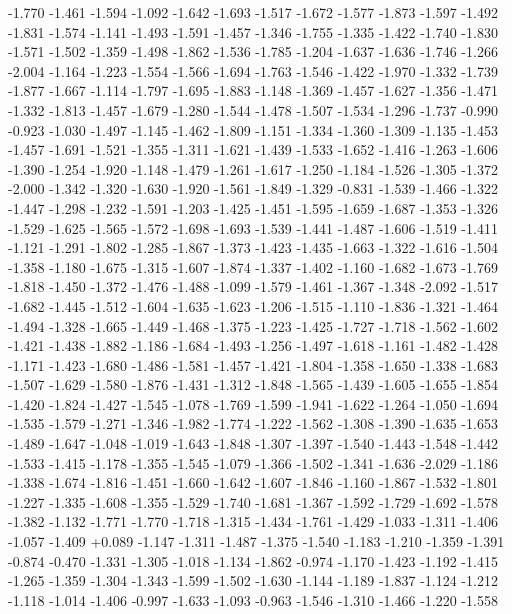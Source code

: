 \documentclass[9pt]{article}
\theoremstyle{plain}
\theoremstyle{definition}
\theoremstyle{remark}
\numberwithin{equation}{section}
\begin{document}
-1.770
-1.461
-1.594
-1.092
-1.642
-1.693
-1.517
-1.672
-1.577
-1.873
-1.597
-1.492
-1.831
-1.574
-1.141
-1.493
-1.591
-1.457
-1.346
-1.755
-1.335
-1.422
-1.740
-1.830
-1.571
-1.502
-1.359
-1.498
-1.862
-1.536
-1.785
-1.204
-1.637
-1.636
-1.746
-1.266
-2.004
-1.164
-1.223
-1.554
-1.566
-1.694
-1.763
-1.546
-1.422
-1.970
-1.332
-1.739
-1.877
-1.667
-1.114
-1.797
-1.695
-1.883
-1.148
-1.369
-1.457
-1.627
-1.356
-1.471
-1.332
-1.813
-1.457
-1.679
-1.280
-1.544
-1.478
-1.507
-1.534
-1.296
-1.737
-0.990
-0.923
-1.030
-1.497
-1.145
-1.462
-1.809
-1.151
-1.334
-1.360
-1.309
-1.135
-1.453
-1.457
-1.691
-1.521
-1.355
-1.311
-1.621
-1.439
-1.533
-1.652
-1.416
-1.263
-1.606
-1.390
-1.254
-1.920
-1.148
-1.479
-1.261
-1.617
-1.250
-1.184
-1.526
-1.305
-1.372
-2.000
-1.342
-1.320
-1.630
-1.920
-1.561
-1.849
-1.329
-0.831
-1.539
-1.466
-1.322
-1.447
-1.298
-1.232
-1.591
-1.203
-1.425
-1.451
-1.595
-1.659
-1.687
-1.353
-1.326
-1.529
-1.625
-1.565
-1.572
-1.698
-1.693
-1.539
-1.441
-1.487
-1.606
-1.519
-1.411
-1.121
-1.291
-1.802
-1.285
-1.867
-1.373
-1.423
-1.435
-1.663
-1.322
-1.616
-1.504
-1.358
-1.180
-1.675
-1.315
-1.607
-1.874
-1.337
-1.402
-1.160
-1.682
-1.673
-1.769
-1.818
-1.450
-1.372
-1.476
-1.488
-1.099
-1.579
-1.461
-1.367
-1.348
-2.092
-1.517
-1.682
-1.445
-1.512
-1.604
-1.635
-1.623
-1.206
-1.515
-1.110
-1.836
-1.321
-1.464
-1.494
-1.328
-1.665
-1.449
-1.468
-1.375
-1.223
-1.425
-1.727
-1.718
-1.562
-1.602
-1.421
-1.438
-1.882
-1.186
-1.684
-1.493
-1.256
-1.497
-1.618
-1.161
-1.482
-1.428
-1.171
-1.423
-1.680
-1.486
-1.581
-1.457
-1.421
-1.804
-1.358
-1.650
-1.338
-1.683
-1.507
-1.629
-1.580
-1.876
-1.431
-1.312
-1.848
-1.565
-1.439
-1.605
-1.655
-1.854
-1.420
-1.824
-1.427
-1.545
-1.078
-1.769
-1.599
-1.941
-1.622
-1.264
-1.050
-1.694
-1.535
-1.579
-1.271
-1.346
-1.982
-1.774
-1.222
-1.562
-1.308
-1.390
-1.635
-1.653
-1.489
-1.647
-1.048
-1.019
-1.643
-1.848
-1.307
-1.397
-1.540
-1.443
-1.548
-1.442
-1.533
-1.415
-1.178
-1.355
-1.545
-1.079
-1.366
-1.502
-1.341
-1.636
-2.029
-1.186
-1.338
-1.674
-1.816
-1.451
-1.660
-1.642
-1.607
-1.846
-1.160
-1.867
-1.532
-1.801
-1.227
-1.335
-1.608
-1.355
-1.529
-1.740
-1.681
-1.367
-1.592
-1.729
-1.692
-1.578
-1.382
-1.132
-1.771
-1.770
-1.718
-1.315
-1.434
-1.761
-1.429
-1.033
-1.311
-1.406
-1.057
-1.409
+0.089
-1.147
-1.311
-1.487
-1.375
-1.540
-1.183
-1.210
-1.359
-1.391
-0.874
-0.470
-1.331
-1.305
-1.018
-1.134
-1.862
-0.974
-1.170
-1.423
-1.192
-1.415
-1.265
-1.359
-1.304
-1.343
-1.599
-1.502
-1.630
-1.144
-1.189
-1.837
-1.124
-1.212
-1.118
-1.014
-1.406
-0.997
-1.633
-1.093
-0.963
-1.546
-1.310
-1.466
-1.220
-1.558
\end{document}
